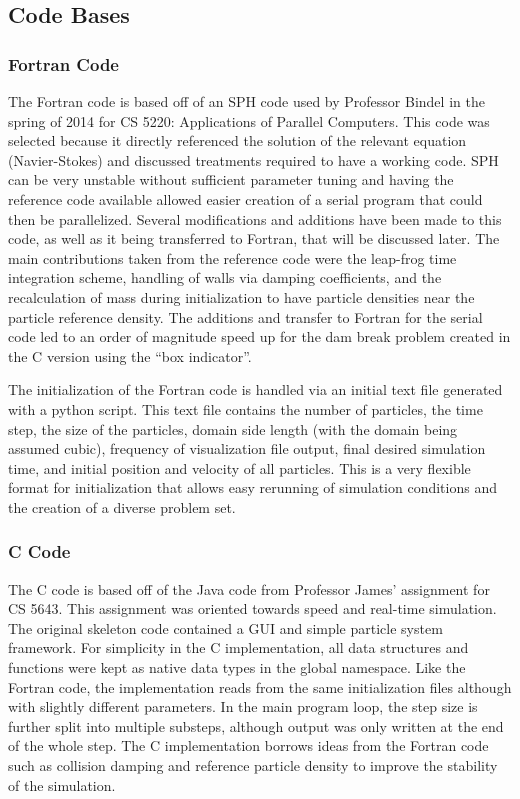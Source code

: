 \documentclass{scrartcl}
\begin{document}
    \subsection{Code Bases}
    
    \subsubsection{Fortran Code}
    The Fortran code is based off of an SPH code used by Professor Bindel in the spring of 2014 for CS 5220: Applications of Parallel Computers. This code was selected because it directly referenced the solution of the relevant equation (Navier-Stokes) and discussed treatments required to have a working code. SPH can be very unstable without sufficient parameter tuning and having the reference code available allowed easier creation of a serial program that could then be parallelized. Several modifications and additions have been made to this code, as well as it being transferred to Fortran, that will be discussed later. The main contributions taken from the reference code were the leap-frog time integration scheme, handling of walls via damping coefficients, and the recalculation of mass during initialization to have particle densities near the particle reference density. The additions and transfer to Fortran for the serial code led to an order of magnitude speed up for the dam break problem created in the C version using the ``box indicator''. 
    
    The initialization of the Fortran code is handled via an initial text file generated with a python script. This text file contains the number of particles, the time step, the size of the particles, domain side length (with the domain being assumed cubic), frequency of visualization file output, final desired simulation time, and initial position and velocity of all particles. This is a very flexible format for initialization that allows easy rerunning of simulation conditions and the creation of a diverse problem set.
    
    
    \subsubsection{C Code}
    
    The C code is based off of the Java code from Professor James' assignment for CS 5643. This assignment was oriented towards speed and real-time simulation. The original skeleton code contained a GUI and simple particle system framework. For simplicity in the C implementation, all data structures and functions were kept as native data types in the global namespace. Like the Fortran code, the implementation reads from the same initialization files although with slightly different parameters. In the main program loop, the step size is further split into multiple substeps, although output was only written at the end of the whole step. The C implementation borrows ideas from the Fortran code such as collision damping and reference particle density to improve the stability of the simulation.
    
\end{document}
